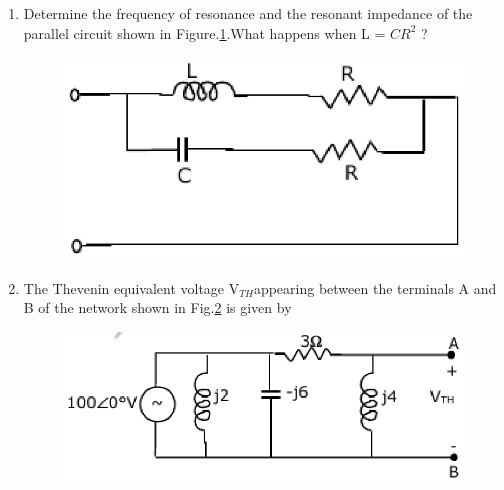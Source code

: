 \documentclass[journal,12pt,twocolumn]{IEEEtran}
\begin{document}
\begin{enumerate}
\item Determine the frequency of resonance and the resonant impedance of the parallel circuit shown in Figure.\ref{fig23}.What happens when L = $CR^{2}$ ?
\begin{figure}[!h]
\begin{center}
\includegraphics[scale=0.5]{./figs/fig23.eps}
\caption{}
\label{fig23}
\end{center}
\end{figure}


\item The Thevenin equivalent voltage V$_{TH}$appearing between the terminals A and B of
the network shown in Fig.\ref{fig24} is given by
\begin{enumerate}
\setlength\itemsep{2em}
\begin{figure}[!h]
\begin{center}
\includegraphics[scale=0.5]{./figs/fig24.eps}
\caption{}
\label{fig24}
\end{center}
\end{figure}
\end{enumerate}


\end{enumerate}
\end{document}
